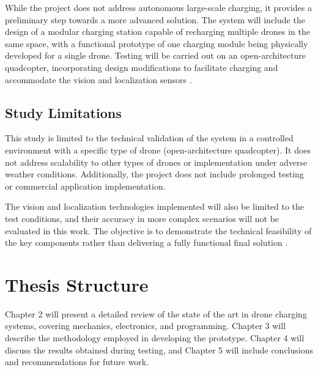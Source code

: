 While the project does not address autonomous large-scale charging, it provides a preliminary step towards a more advanced solution. The system will include the design of a modular charging station capable of recharging multiple drones in the same space, with a functional prototype of one charging module being physically developed for a single drone. Testing will be carried out on an open-architecture quadcopter, incorporating design modifications to facilitate charging and accommodate the vision and localization sensors \cite{cite3}.

\subsection{Study Limitations}

This study is limited to the technical validation of the system in a controlled environment with a specific type of drone (open-architecture quadcopter). It does not address scalability to other types of drones or implementation under adverse weather conditions. Additionally, the project does not include prolonged testing or commercial application implementation.

The vision and localization technologies implemented will also be limited to the test conditions, and their accuracy in more complex scenarios will not be evaluated in this work. The objective is to demonstrate the technical feasibility of the key components rather than delivering a fully functional final solution \cite{cite4}.

\section{Thesis Structure}

Chapter 2 will present a detailed review of the state of the art in drone charging systems, covering mechanics, electronics, and programming. Chapter 3 will describe the methodology employed in developing the prototype. Chapter 4 will discuss the results obtained during testing, and Chapter 5 will include conclusions and recommendations for future work.
